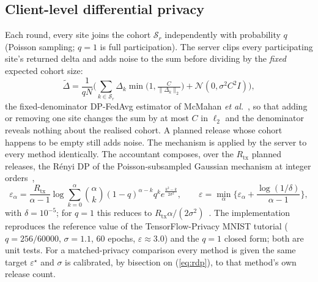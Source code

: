 \subsection{Client-level differential privacy}
\label{sec:security-dp}
Each round, every site joins the cohort $\mathcal S_r$ independently with probability $q$ (Poisson sampling; $q=1$ is full participation). The server clips every participating site's returned delta and adds noise to the sum before dividing by the \emph{fixed} expected cohort size:
\begin{equation}
\tilde\Delta=\frac1{qN}\Big(\sum_{k\in\mathcal S_r}\Delta_k\min\big(1,\tfrac{C}{\|\Delta_k\|_2}\big)+\mathcal N(0,\sigma^2C^2I)\Big),
\label{eq:dp}
\end{equation}
the fixed-denominator DP-FedAvg estimator of McMahan \emph{et al.}~\cite{mcmahan2018dp}, so that adding or removing one site changes the sum by at most $C$ in $\ell_2$ and the denominator reveals nothing about the realised cohort. A planned release whose cohort happens to be empty still adds noise. The mechanism is applied by the server to every method identically. The accountant composes, over the $R_{\mathrm{tx}}$ planned releases, the R\'enyi DP of the Poisson-subsampled Gaussian mechanism at integer orders~\cite{mironov2019sgm},
\begin{equation}
\varepsilon_\alpha=\frac{R_{\mathrm{tx}}}{\alpha-1}\log\sum_{k=0}^{\alpha}\binom{\alpha}{k}(1-q)^{\alpha-k}q^k e^{\frac{k^2-k}{2\sigma^2}},\qquad
\varepsilon=\min_{\alpha}\Big\{\varepsilon_\alpha+\frac{\log(1/\delta)}{\alpha-1}\Big\},
\label{eq:rdp}
\end{equation}
with $\delta=10^{-5}$; for $q=1$ this reduces to $R_{\mathrm{tx}}\alpha/(2\sigma^2)$~\cite{mironov2017}. The implementation reproduces the reference value of the TensorFlow-Privacy MNIST tutorial ($q=256/60000$, $\sigma=1.1$, 60 epochs, $\varepsilon\approx3.0$) and the $q=1$ closed form; both are unit tests. For a matched-privacy comparison every method is given the same target $\varepsilon^\star$ and $\sigma$ is calibrated, by bisection on (\ref{eq:rdp}), to that method's own release count.


